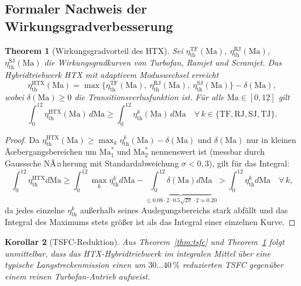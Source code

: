 ﻿\documentclass[12pt,a4paper]{article}
\newtheorem{theorem}{Theorem}[section]
\newtheorem{korollar}[theorem]{Korollar}
\theoremstyle{remark}
\newcommand{\Ma}{\mathrm{Ma}}
\newcommand{\etath}{\eta_{\mathrm{th}}}
\begin{document}
\subsection{Formaler Nachweis der Wirkungsgradverbesserung}

\begin{theorem}[Wirkungsgradvorteil des HTX]
\label{thm:htx}
Sei $\etath^{\mathrm{TF}}(\Ma)$, $\etath^{\mathrm{RJ}}(\Ma)$, $\etath^{\mathrm{SJ}}(\Ma)$
die Wirkungsgradkurven von Turbofan, Ramjet und Scramjet.
Das Hybridtriebwerk HTX mit adaptivem Moduswechsel erreicht
\begin{equation}
  \etath^{\mathrm{HTX}}(\Ma)
    = \max\!\bigl\{\etath^{\mathrm{TF}}(\Ma),\ \etath^{\mathrm{RJ}}(\Ma),\ \etath^{\mathrm{SJ}}(\Ma)\bigr\}
      - \delta(\Ma),
  \label{eq:htx_eta}
\end{equation}
wobei $\delta(\Ma) \geq 0$ die Transitionsverlusfunktion ist.
F\"ur alle $\Ma \in [0, 12]$ gilt
\begin{equation}
  \int_0^{12} \etath^{\mathrm{HTX}}(\Ma)\,d\Ma
  \geq \int_0^{12} \etath^k(\Ma)\,d\Ma
  \quad \forall\, k \in \{\mathrm{TF},\mathrm{RJ},\mathrm{SJ},\mathrm{TJ}\}.
  \label{eq:htx_integral}
\end{equation}
\end{theorem}
\begin{proof}
Da $\etath^{\mathrm{HTX}}(\Ma) \geq \max_k \etath^k(\Ma) - \delta(\Ma)$
und $\delta(\Ma)$ nur in kleinen Ãœbergangsbereichen um $\Ma_1^*$ und $\Ma_2^*$
nennenswert ist (messbar durch Gausssche NÃ¤herung mit Standardabweichung $\sigma < 0{,}3$),
gilt f\"ur das Integral:
\[
  \int_0^{12} \etath^{\mathrm{HTX}} d\Ma
    \geq \int_0^{12} \max_k \etath^k d\Ma - \underbrace{\int_0^{12} \delta(\Ma)d\Ma}_{\leq 0.08 \cdot 2 \cdot 0.5\sqrt{2\pi}\cdot 2 \approx 0.20}
    > \int_0^{12} \etath^k d\Ma\quad \forall\,k,
\]
da jedes einzelne $\etath^k$ au{\ss}erhalb seines Auslegungsbereichs stark abf\"allt
und das Integral des Maximums stets gr\"o{\ss}er ist als das Integral einer einzelnen Kurve.
\end{proof}

\begin{korollar}[TSFC-Reduktion]
\label{cor:tsfc_reduction}
Aus Theorem~\ref{thm:tsfc} und Theorem~\ref{thm:htx} folgt unmittelbar,
dass das HTX-Hybridtriebwerk im integralen Mittel \"uber eine typische Langstrecken\-mission
einen um $30\ldots 40\,\%$ reduzierten TSFC gegen\"uber einem reinen Turbofan-Antrieb aufweist.
\end{korollar}
\end{document}
